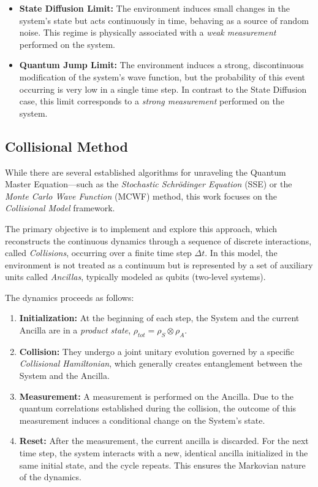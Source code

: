 \documentclass[a4paper,12pt]{article}
\begin{document}
	\begin{itemize}
		\item \textbf{State Diffusion Limit:} The environment induces small changes in the system's state but acts continuously in time, behaving as a source of random noise. This regime is physically associated with a \textit{weak measurement} performed on the system.

		\item \textbf{Quantum Jump Limit:} The environment induces a strong, discontinuous modification of the system's wave function, but the probability of this event occurring is very low in a single time step. In contrast to the State Diffusion case, this limit corresponds to a \textit{strong measurement} performed on the system.
	\end{itemize}

	\subsection{Collisional Method}
	\label{sub:CM}
	While there are several established algorithms for unraveling the Quantum Master Equation—such as the \textit{Stochastic Schr\"odinger Equation} (SSE) or the \textit{Monte Carlo Wave Function} (MCWF) method, this work focuses on the \textit{Collisional Model} framework.

	The primary objective is to implement and explore this approach, which reconstructs the continuous dynamics through a sequence of discrete interactions, called \textit{Collisions}, occurring over a finite time step $\Delta t$.
	In this model, the environment is not treated as a continuum but is represented by a set of auxiliary units called \textit{Ancillas}, typically modeled as qubits (two-level systems).

	The dynamics proceeds as follows:
	\begin{enumerate}
		\item \textbf{Initialization:} At the beginning of each step, the System and the current Ancilla are in a \textit{product state}, $\rho_{tot} = \rho_S \otimes \rho_A$.
		\item \textbf{Collision:} They undergo a joint unitary evolution governed by a specific \textit{Collisional Hamiltonian}, which generally creates entanglement between the System and the Ancilla.
		\item \textbf{Measurement:} A measurement is performed on the Ancilla. Due to the quantum correlations established during the collision, the outcome of this measurement induces a conditional change on the System's state.
		\item \textbf{Reset:} After the measurement, the current ancilla is discarded. For the next time step, the system interacts with a new, identical ancilla initialized in the same initial state, and the cycle repeats. This ensures the Markovian nature of the dynamics.
	\end{enumerate}
\end{document}
